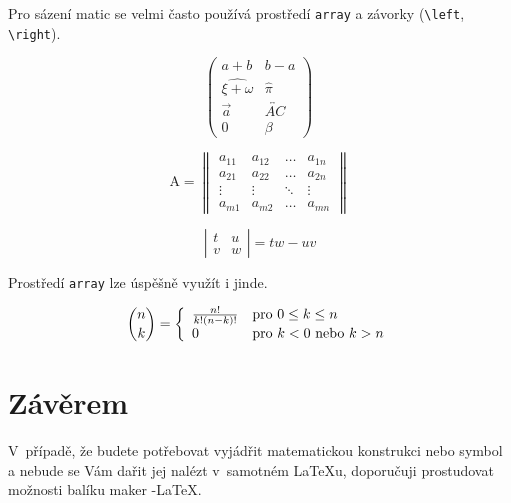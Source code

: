 \documentclass[a4paper, 11pt, twocolumn]{article}
\theoremstyle{definition}
\theoremstyle{plain}
\theoremstyle{plain}
\begin{document}
	Pro sázení matic se velmi často používá prostředí \texttt{array} a závorky (\verb|\left|, \verb|\right|). 
	

	$$\left( \begin{array}{cc}
			a+b & b-a\\
			\widehat{\xi+\omega} & \hat{\pi}\\
			\vec{a}	& \overleftrightarrow{AC}	\\
			0 & \beta \end{array} \right)\ $$
			
	$$\text{A} = \left\| \begin{array}{cccc}
	a_{11} & a_{12} & \dots & a_{1n}\\
	a_{21} & a_{22} & \dots & a_{2n}\\
	\vdots & \vdots & \ddots & \vdots \\
	a_{m1} & a_{m2} & \dots & a_{mn} \end{array} \right\| $$
	
	$$\left| \begin{array}{cc}
	t & u \\
	v & w \end{array} \right| = tw - uv $$
	
	Prostředí \texttt{array} lze úspěšně využít i jinde.


			$$ \binom{n}{k} = 
			\left\{ \begin{array}{l l}
			\frac{n!}{k!(n-k)!} & \text{pro } 0 \leq k \leq n\\
			0 & \text{pro } k < 0 \text{ nebo } k > n
			\end{array} \right. $$
			


	\section{Závěrem}
	V~případě, že budete potřebovat vyjádřit matematickou konstrukci nebo symbol a nebude se Vám dařit jej nalézt v~samotném \LaTeX u, doporučuji prostudovat možnosti balíku maker \AmS-\LaTeX.
	
\end{document}
